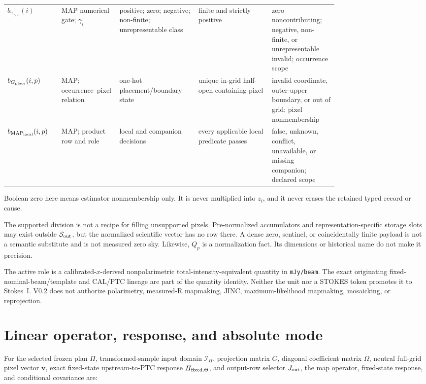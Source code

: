 \documentclass[10pt]{article}
\newcommand{\code}[1]{\nolinkurl{#1}}
\begin{document}
{\begin{longtable}{L{0.11\linewidth}L{0.15\linewidth}L{0.17\linewidth}L{0.19\linewidth}L{0.16\linewidth}}
\(b_{\gamma_{>0}}(i)\) & MAP numerical gate; \(\gamma_i\) & positive; zero; negative; non-finite; unrepresentable class & finite and strictly positive & zero noncontributing; negative, non-finite, or unrepresentable invalid; occurrence scope\\
\(b_{G_{\rm place}}(i,p)\) & MAP; occurrence--pixel relation & one-hot placement/boundary state & unique in-grid half-open containing pixel & invalid coordinate, outer-upper boundary, or out of grid; pixel nonmembership\\
\(b_{{\rm MAP}_{\rm local}}(i,p)\) & MAP; product row and role & local and companion decisions & every applicable local predicate passes & false, unknown, conflict, unavailable, or missing companion; declared scope\\
\bottomrule
\end{longtable}
}

Boolean zero here means estimator nonmembership only. It is never multiplied
into \(z_i\), and it never erases the retained typed record or cause.

The supported division is not a recipe for filling unsupported pixels.
Pre-normalized accumulators and representation-specific storage slots may exist outside
\(\mathcal S_{\rm out}\), but the normalized scientific vector has no row
there. A dense zero, sentinel, or coincidentally finite payload is not a
semantic substitute and is not measured zero sky. Likewise, \(Q_p\) is a
normalization fact. Its dimensions or historical name do not make it
precision.

The active role is a calibrated-\(x\)-derived nonpolarimetric
total-intensity-equivalent quantity in \code{mJy/beam}. The exact originating
fixed-nominal-beam/template and CAL/PTC lineage are part of the quantity
identity. Neither the unit nor a STOKES token promotes it to Stokes~I. V0.2
does not authorize polarimetry, measured-R mapmaking, JINC,
maximum-likelihood mapmaking, mosaicking, or reprojection.

\clearpage
\section{Linear operator, response, and absolute mode}\label{sec:response}

For the selected frozen plan \(\Pi\), transformed-sample input domain
\(\mathcal I_\Pi\), projection matrix \(G\), diagonal coefficient matrix
\(\Omega\), neutral full-grid pixel vector \(\boldsymbol v\), exact fixed-state
upstream-to-PTC response \(H_{{\rm fixed},\Theta}\), and output-row selector
\(J_{\rm out}\), the map operator, fixed-state response, and conditional
covariance are:
\end{document}
